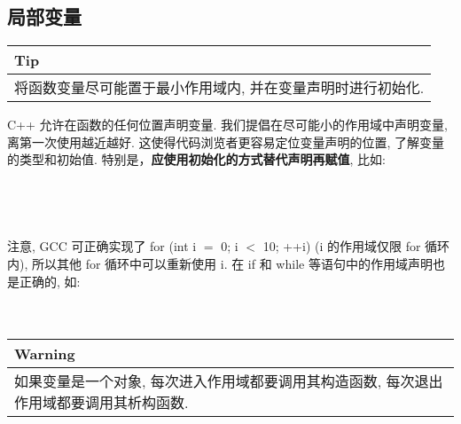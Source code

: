 \documentclass[a4paper,11pt,CJK]{article}
\begin{document}
\begin{CJK}{UTF8}{gbsn}
\subsection{局部变量}
\begin{table}[htbp]
\flushleft
\begin{tabular}{p{400pt}}
\toprule
\rowcolor[gray]{.8} Tip \\
\midrule
将函数变量尽可能置于最小作用域内, 并在变量声明时进行初始化.\\
\bottomrule
\end{tabular}
\end{table}
C++ 允许在函数的任何位置声明变量. 我们提倡在尽可能小的作用域中声明变量, 离第一次使用越近越好. 这使得代码浏览者更容易定位变量声明的位置, 了解变量的类型和初始值. 特别是，\textbf{应使用初始化的方式替代声明再赋值}, 比如:\\
\\
\\
\\
\\
\indent 注意, GCC 可正确实现了 for (int i $=$ 0; i $<$ 10; ++i) (i 的作用域仅限 for 循环内), 所以其他 for 循环中可以重新使用 i. 在 if 和 while 等语句中的作用域声明也是正确的, 如:\\
\\
\\
\begin{table}[htbp]
\flushleft
\begin{tabular}{p{400pt}}
\toprule
\rowcolor{red} Warning \\
\midrule
如果变量是一个对象, 每次进入作用域都要调用其构造函数, 每次退出作用域都要调用其析构函数.\\
\bottomrule
\end{tabular}
\end{table}
\\
\end{CJK}
\end{document}

